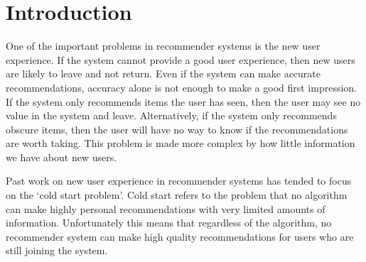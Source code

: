 \documentclass[letterpaper]{sig-alternate}
\begin{document}
\section{Introduction}

  One of the important problems in recommender systems is the new user experience.
  If the system cannot provide a good user experience, then new users are likely to leave and not return.
  Even if the system can make accurate recommendations, accuracy alone is not enough to make a good first impression.
  If the system only recommends items the user has seen, then the user may see no value in the system and leave.
  Alternatively, if the system only recommends obscure items, then the user will have no way to know if the recommendations are worth taking.
  This problem is made more complex by how little information we have about new users.
  

  Past work on new user experience in recommender systems has tended to focus on the `cold start problem'.
  Cold start refers to the problem that no algorithm can make highly personal recommendations with very limited amounts of information.
  Unfortunately this means that regardless of the algorithm, no recommender system can make high quality recommendations for users who are still joining the system.
  
\end{document}

